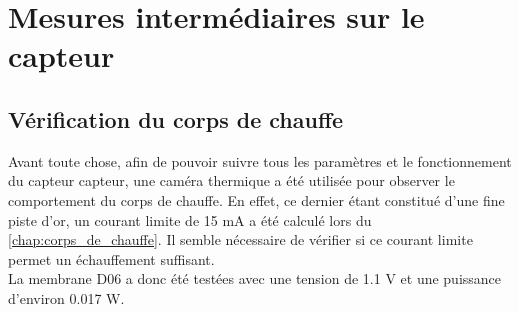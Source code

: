 \section{Mesures intermédiaires sur le capteur}
\label{chap:mesures}
\subsection{Vérification du corps de chauffe}
Avant toute chose, afin de pouvoir suivre tous les paramètres et le fonctionnement du capteur \gls{capteur}, une caméra thermique a été utilisée
pour observer le comportement du corps de chauffe. En effet, ce dernier étant constitué d'une fine piste d'or, un courant limite de 15 mA a été 
calculé lors du \ref{chap:corps_de_chauffe}. Il semble nécessaire de vérifier si ce courant limite permet un échauffement suffisant. \\

La membrane D06 a donc été testées avec une tension de 1.1 V et une puissance d'environ 0.017 W. 

